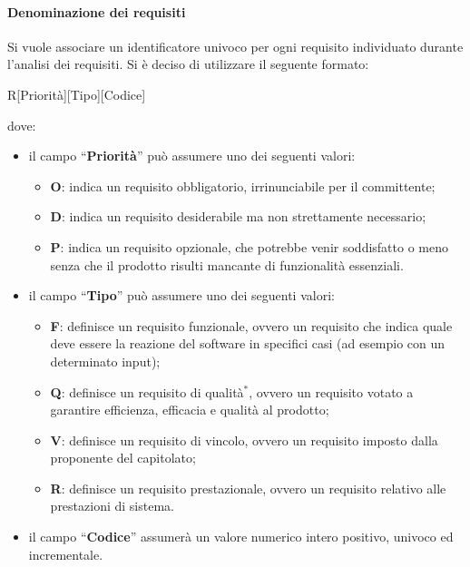 \documentclass[11pt,a4paper]{article}
\begin{document}
{	\paragraph{Denominazione dei requisiti\\}
	Si vuole associare un identificatore univoco per ogni requisito individuato durante l'analisi dei requisiti. Si \`e deciso di utilizzare il seguente formato:
	\begin{center}
		R[Priorità][Tipo][Codice]
	\end{center}
	dove:
	\begin{itemize}
		\item il campo “\textbf{Priorità}” può assumere uno dei seguenti valori:
		\begin{itemize}
			\item \textbf{O}: indica un requisito obbligatorio, irrinunciabile per il committente;
			\item \textbf{D}: indica un requisito desiderabile ma non strettamente necessario;
			\item \textbf{P}: indica un requisito opzionale, che potrebbe venir soddisfatto o meno senza che il prodotto risulti mancante di funzionalità essenziali.
		\end{itemize}
		\item il campo “\textbf{Tipo}” può assumere uno dei seguenti valori:
		\begin{itemize}
			\item \textbf{F}: definisce un requisito funzionale, ovvero un requisito che indica quale deve essere la reazione del software in specifici casi (ad esempio con  un determinato input);
			\item \textbf{Q}: definisce un requisito di qualità$^*$, ovvero un requisito votato a garantire efficienza, efficacia e qualità al prodotto;
			\item \textbf{V}: definisce un requisito di vincolo, ovvero un requisito imposto dalla proponente del capitolato;
			\item \textbf{R}: definisce un requisito prestazionale, ovvero un requisito relativo alle prestazioni di sistema.
		\end{itemize}
		\item il campo “\textbf{Codice}” assumerà un valore numerico intero positivo, univoco ed incrementale.
	\end{itemize}
	
}
\end{document}
